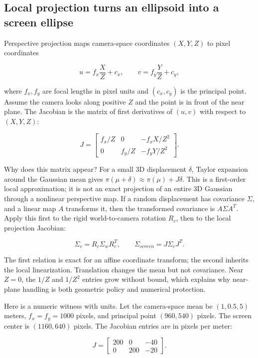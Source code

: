 \subsection{Local projection turns an ellipsoid into a screen ellipse}\label{04-visual-computing-ii-ch037-local-projection-turns-an-ellipsoid-into-a-screen-ellipse}

Perspective projection maps camera-space coordinates \((X,Y,Z)\) to pixel coordinates

\[
u=f_x\frac XZ+c_x,\qquad v=f_y\frac YZ+c_y,
\]

where \(f_x,f_y\) are focal lengths in pixel units and \((c_x,c_y)\) is the principal point. Assume the camera looks along positive \(Z\) and the point is in front of the near plane. The Jacobian is the matrix of first derivatives of \((u,v)\) with respect to \((X,Y,Z)\):

\[
J=\begin{bmatrix}
f_x/Z&0&-f_xX/Z^2\\
0&f_y/Z&-f_yY/Z^2
\end{bmatrix}.
\]

Why does this matrix appear? For a small 3D displacement \(\delta\), Taylor expansion around the Gaussian mean gives \(\pi(\mu+\delta)\approx\pi(\mu)+J\delta\). This is a first-order local approximation; it is not an exact projection of an entire 3D Gaussian through a nonlinear perspective map. If a random displacement has covariance \(\Sigma\), and a linear map \(A\) transforms it, then the transformed covariance is \(A\Sigma A^T\). Apply this first to the rigid world-to-camera rotation \(R_c\), then to the local projection Jacobian:

\[
\Sigma_c=R_c\Sigma_wR_c^T,
\qquad
\Sigma_{screen}=J\Sigma_cJ^T.
\]

The first relation is exact for an affine coordinate transform; the second inherits the local linearization. Translation changes the mean but not covariance. Near \(Z=0\), the \(1/Z\) and \(1/Z^2\) entries grow without bound, which explains why near-plane handling is both geometric policy and numerical protection.

Here is a numeric witness with units. Let the camera-space mean be \((1,0.5,5)\) meters, \(f_x=f_y=1000\) pixels, and principal point \((960,540)\) pixels. The screen center is \((1160,640)\) pixels. The Jacobian entries are in pixels per meter:

\[
J=\begin{bmatrix}200&0&-40\\0&200&-20\end{bmatrix}.
\]

